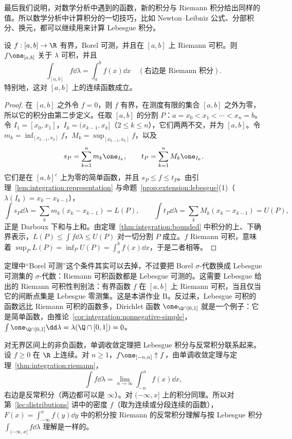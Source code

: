 
最后我们说明，对数学分析中遇到的函数，新的积分与 Riemann 积分给出同样的值。所以数学分析中计算积分的一切技巧，比如 Newton--Leibniz 公式、分部积分、换元，都可以继续用来计算 Lebesgue 积分。

\begin{theorem}\label{thm:integration:riemann}
设 $f:[a,b]\to\R$ 有界，Borel 可测，并且在 $[a,b]$ 上 Riemann 可积。则 $f\one_{[a,b]}$ 关于 $\lambda$ 可积，并且
\[
\int_{[a,b]}f\dd\lambda=\int_a^bf(x)\dd x\quad(\text{右边是 Riemann 积分}).
\]
特别地，这对 $[a,b]$ 上的连续函数成立。
\end{theorem}
\begin{proof}
在 $[a,b]$ 之外令 $f=0$，则 $f$ 有界，在测度有限的集合 $[a,b]$ 之外为零，所以它的积分由第二步定义。任取 $[a,b]$ 的分割 $P$：$a=x_0<x_1<\cdots<x_n=b$。令 $I_1=[x_0,x_1]$，$I_k=(x_{k-1},x_k]$（$2\leqslant k\leqslant n$），它们两两不交，并为 $[a,b]$。令 $m_k=\inf_{[x_{k-1},x_k]}f$，$M_k=\sup_{[x_{k-1},x_k]}f$，以及
\[
s_P=\sum_{k=1}^nm_k\one_{I_k},\qquad t_P=\sum_{k=1}^nM_k\one_{I_k}.
\]
它们是在 $[a,b]^c$ 上为零的简单函数，并且 $s_P\leqslant f\leqslant t_P$。由引理~\ref{lem:integration:representation} 与命题~\ref{prop:extension:lebesgue}(1)（$\lambda(I_k)=x_k-x_{k-1}$），
\[
\int s_P\dd\lambda=\sum_km_k(x_k-x_{k-1})=L(P),\qquad\int t_P\dd\lambda=\sum_kM_k(x_k-x_{k-1})=U(P),
\]
正是 Darboux 下和与上和。由定理~\ref{thm:integration:bounded} 中积分的上、下确界表示，$L(P)\leqslant\int f\dd\lambda\leqslant U(P)$ 对一切分割 $P$ 成立。$f$ Riemann 可积，意味着 $\sup_PL(P)=\inf_PU(P)=\int_a^bf(x)\dd x$，于是二者相等。
\end{proof}

\begin{remark}
定理中“Borel 可测”这个条件其实可以去掉，不过要把 Borel $\sigma$-代数换成 Lebesgue 可测集的 $\sigma$-代数：Riemann 可积函数都是 Lebesgue 可测的。这需要 Lebesgue 给出的 Riemann 可积性判别法：有界函数 $f$ 在 $[a,b]$ 上 Riemann 可积，当且仅当它的间断点集是 Lebesgue 零测集。这是本讲作业 B。反过来，Lebesgue 可积的函数远比 Riemann 可积的函数多，Dirichlet 函数 $\one_{\Q\cap[0,1]}$ 就是一个例子：它是简单函数，由推论~\ref{cor:integration:nonnegative-simple}，$\int\one_{\Q\cap[0,1]}\dd\lambda=\lambda(\Q\cap[0,1])=0$。
\end{remark}

对无界区间上的非负函数，单调收敛定理把 Lebesgue 积分与反常积分联系起来。设 $f\geqslant0$ 在 $\R$ 上连续。对 $n\geqslant1$，$f\one_{[-n,n]}\uparrow f$，由单调收敛定理与定理~\ref{thm:integration:riemann}，
\[
\int f\dd\lambda=\lim_{n\to\infty}\int_{-n}^nf(x)\dd x,
\]
右边是反常积分（两边都可以是 $\infty$）。对 $(-\infty,x]$ 上的积分同理。所以对第~\ref{lec:distributions} 讲中的密度 $f$（取为连续或分段连续的函数），$F(x)=\int_{-\infty}^xf(y)\dd y$ 中的积分按 Riemann 的反常积分理解与按 Lebesgue 积分 $\int_{(-\infty,x]}f\dd\lambda$ 理解是一样的。

